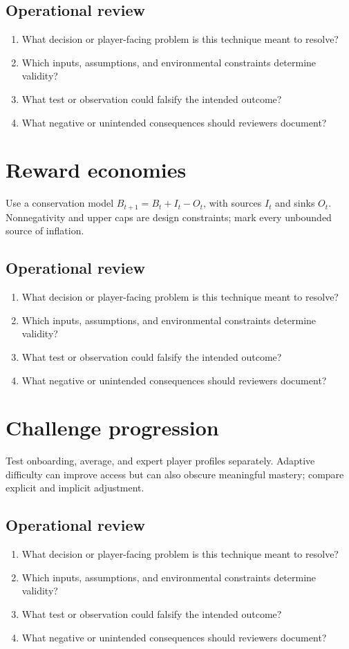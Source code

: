 \documentclass[11pt]{article}
\begin{document}
\subsection{Operational review}
\begin{enumerate}
\item What decision or player-facing problem is this technique meant to resolve?
\item Which inputs, assumptions, and environmental constraints determine validity?
\item What test or observation could falsify the intended outcome?
\item What negative or unintended consequences should reviewers document?
\end{enumerate}

\section{Reward economies}
Use a conservation model $B_{t+1}=B_t+I_t-O_t$, with sources $I_t$ and sinks $O_t$. Nonnegativity and upper caps are design constraints; mark every unbounded source of inflation.


\subsection{Operational review}
\begin{enumerate}
\item What decision or player-facing problem is this technique meant to resolve?
\item Which inputs, assumptions, and environmental constraints determine validity?
\item What test or observation could falsify the intended outcome?
\item What negative or unintended consequences should reviewers document?
\end{enumerate}

\section{Challenge progression}
Test onboarding, average, and expert player profiles separately. Adaptive difficulty can improve access but can also obscure meaningful mastery; compare explicit and implicit adjustment.


\subsection{Operational review}
\begin{enumerate}
\item What decision or player-facing problem is this technique meant to resolve?
\item Which inputs, assumptions, and environmental constraints determine validity?
\item What test or observation could falsify the intended outcome?
\item What negative or unintended consequences should reviewers document?
\end{enumerate}
\end{document}
